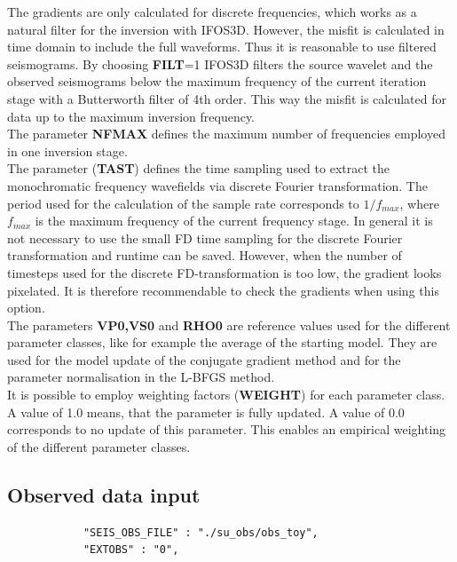 The gradients are only calculated for discrete frequencies, which works as a natural filter for the inversion with IFOS3D. However, the misfit is calculated in time domain to include the full waveforms. Thus it is reasonable to use filtered seismograms. By choosing \textbf{FILT}=1 IFOS3D filters the source wavelet and the observed seismograms below the maximum frequency of the current iteration stage with a Butterworth filter of 4th order. This way the misfit is calculated for data up to the maximum inversion frequency.
\vspace{0.3cm}\\

The parameter \textbf{NFMAX} defines the maximum number of frequencies employed in one inversion stage.
\vspace{0.3cm}\\

The parameter (\textbf{TAST}) defines the time sampling used to extract the monochromatic frequency wavefields via discrete Fourier transformation. The period used for the calculation of the sample rate corresponds to $1/f_{max}$, where $f_{max}$ is the maximum frequency of the current frequency stage. In general it is not necessary to use the small FD time sampling for the discrete Fourier transformation and runtime can be saved. However, when the number of timesteps used for the discrete FD-transformation is too low, the gradient looks pixelated. It is therefore recommendable to check the gradients when using this option.
\vspace{0.3cm}\\

The parameters \textbf{VP0,VS0} and \textbf{RHO0} are reference values used for the different parameter classes, like for example the average of the starting model. They are used for the model update of the conjugate gradient method and for the parameter normalisation in the L-BFGS method.
\vspace{0.3cm}\\

It is possible to employ weighting factors (\textbf{WEIGHT}) for each parameter class. A value of 1.0 means, that the parameter is fully updated. A value of 0.0 corresponds to no update of this parameter. This enables an empirical weighting of the different parameter classes.
\subsection{Observed data input}
\begin{verbatim}
			"SEIS_OBS_FILE" : "./su_obs/obs_toy",
			"EXTOBS" : "0",
\end{verbatim}

